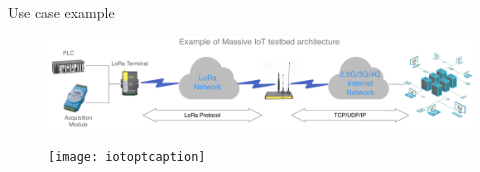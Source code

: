 \begin{frame}{Use case example}

  \begin{figure}
    \centering
    \includegraphics[page=1,scale=0.2]{res/images/loracellalt}
  \end{figure}

  \begin{figure}
    \centering
    \texttt{[image: iotoptcaption]}
  \end{figure}

\end{frame}